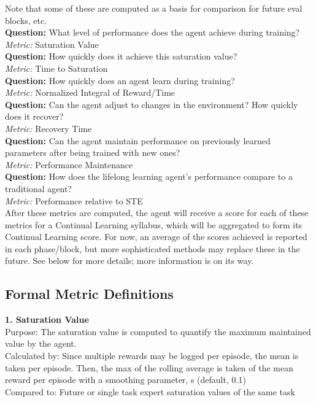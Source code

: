 Note that some of these are computed as a basis for comparison for future eval blocks, etc.\\[0.1in]

\textbf{Question:} What level of performance does the agent achieve during training?\\
\textit{Metric:} Saturation Value\\[0.1in]


\textbf{Question:} How quickly does it achieve this saturation value?\\
\textit{Metric:} Time to Saturation\\[0.1in]

\textbf{Question:} How quickly does an agent learn during training?\\
\textit{Metric:} Normalized Integral of Reward/Time\\[0.1in]


\textbf{Question:} Can the agent adjust to changes in the environment? How quickly does it recover?\\
\textit{Metric:} Recovery Time\\[0.1in]


\textbf{Question:} Can the agent maintain performance on previously learned parameters after being trained with new ones?\\
\textit{Metric:} Performance Maintenance\\[0.1in]


\textbf{Question:} How does the lifelong learning agent's performance compare to a traditional agent?\\
\textit{Metric:} Performance relative to STE \\[0.2in]
            
            

After these metrics are computed, the agent will receive a score for  each of these metrics for a Continual Learning syllabus, which will be aggregated to form its Continual Learning score. For now, an average of the scores achieved is reported in each phase/block, but more sophisticated methods may replace these in the future. See below for more details; more information is on its way.
    


\subsection*{Formal Metric Definitions}

\textbf{1. Saturation Value}\\
Purpose: The saturation value is computed to quantify the maximum maintained value by the agent.\\
Calculated by: Since multiple rewards may be logged per episode, the mean is taken per episode. Then, the max of the rolling average is taken of the mean reward per episode with a smoothing parameter, s (default, 0.1)\\
Compared to: Future or single task expert saturation values of the same task\\[0.1in]         


